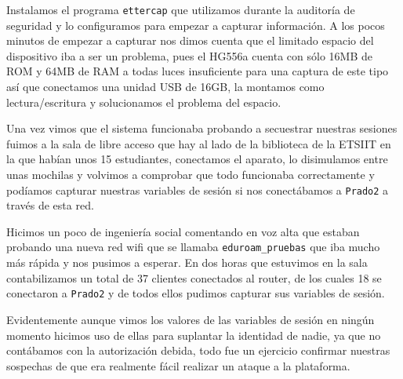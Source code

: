 \bigskip
Instalamos el programa \texttt{ettercap} que utilizamos durante la auditoría de seguridad y lo configuramos para empezar a capturar información. A los pocos minutos de empezar a capturar nos dimos cuenta que el limitado espacio del dispositivo iba a ser un problema, pues el HG556a cuenta con sólo 16MB de ROM y 64MB de RAM a todas luces insuficiente para una captura de este tipo así que conectamos una unidad USB de 16GB, la montamos como lectura/escritura y solucionamos el problema del espacio.

\bigskip
Una vez vimos que el sistema funcionaba probando a secuestrar nuestras sesiones fuimos a la sala de libre acceso que hay al lado de la biblioteca de la ETSIIT en la que habían unos 15 estudiantes, conectamos el aparato, lo disimulamos entre unas mochilas y volvimos a comprobar que todo funcionaba correctamente y podíamos capturar nuestras variables de sesión si nos conectábamos a \texttt{Prado2} a través de esta red.

\bigskip
Hicimos un poco de ingeniería social comentando en voz alta que estaban probando una nueva red wifi que se llamaba \texttt{eduroam\_pruebas} que iba mucho más rápida y nos pusimos a esperar. En dos horas que estuvimos en la sala contabilizamos un total de 37 clientes conectados al router, de los cuales 18 se conectaron a \texttt{Prado2} y de todos ellos pudimos capturar sus variables de sesión.

\bigskip
Evidentemente aunque vimos los valores de las variables de sesión en ningún momento hicimos uso de ellas para suplantar la identidad de nadie, ya que no contábamos con la autorización debida, todo fue un ejercicio confirmar nuestras sospechas de que era realmente fácil realizar un ataque a la plataforma.





